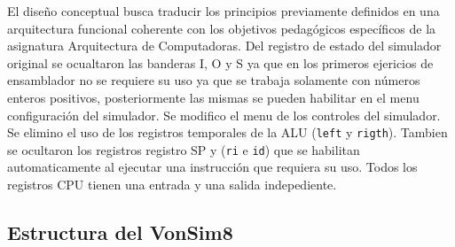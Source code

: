 \documentclass[12pt,oneside]{templates/unerthesis}
\begin{document}
\begin{table}[!h]
\centering
\caption{\label{tab:comparativavonsim}Comparación entre VonSim y VonSim8}
\centering
{}
\end{table}

El diseño conceptual busca traducir los principios previamente definidos en una arquitectura funcional coherente con los objetivos pedagógicos específicos de la asignatura Arquitectura de Computadoras.
Del registro de estado del simulador original se ocualtaron las banderas I, O y S ya que en los primeros ejericios de ensamblador no se requiere su uso ya que se trabaja solamente con números enteros positivos, posteriormente las mismas se pueden habilitar en el menu configuración del simulador.
Se modifico el menu de los controles del simulador.
Se elimino el uso de los registros temporales de la ALU (\texttt{left} y \texttt{rigth}).
Tambien se ocultaron los registros registro SP y (\texttt{ri} e \texttt{id}) que se habilitan automaticamente al ejecutar una instrucción que requiera su uso.
Todos los registros CPU tienen una entrada y una salida indepediente.

\hypertarget{estructura-del-vonsim8}{%
\subsection{Estructura del VonSim8}\label{estructura-del-vonsim8}}
\end{document}
